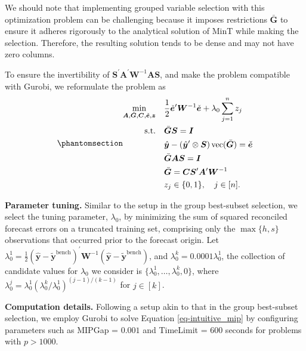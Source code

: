 \documentclass[
  11pt]{article}
\theoremstyle{plain}
\theoremstyle{remark}
\begin{document}
We should note that implementing grouped variable selection with this
optimization problem can be challenging because it imposes restrictions
\(\bar{\bm{G}}\) to ensure it adheres rigorously to the analytical
solution of MinT while making the selection. Therefore, the resulting
solution tends to be dense and may not have zero columns.

To ensure the invertibility of
\(\bm{S}^{\prime}\bm{A}^{\prime}\bm{W}^{-1}\bm{A}\bm{S}\), and make the
problem compatible with Gurobi, we reformulate the problem as
\begin{equation}\phantomsection\label{eq-intuitive_mip}{
\begin{aligned}
\min_{\bm{A},\bar{\bm{G}},\bm{C},\check{\bm{e}},\bm{z}} \quad & \frac{1}{2}\check{\bm{e}}^{\prime} \bm{W}^{-1}\check{\bm{e}} + \lambda_0 \sum_{j=1}^n z_j \\
\text{s.t.} \quad & \bar{\bm{G}}\bm{S} = \bm{I} \\
& \hat{\bm{y}}-\left(\hat{\bm{y}}^{\prime} \otimes \bm{S}\right)\operatorname{vec}(\bar{\bm{G}}) = \check{\bm{e}} \\
& \bar{\bm{G}}\bm{A}\bm{S} = \bm{I} \\
& \bar{\bm{G}} = \bm{C}\bm{S}^{\prime}\bm{A}^{\prime}\bm{W}^{-1} \\
& z_j \in\{0,1\}, \quad j \in[n].
\end{aligned}
}\end{equation}

\textbf{Parameter tuning.} Similar to the setup in the group best-subset
selection, we select the tuning parameter, \(\lambda_0\), by minimizing
the sum of squared reconciled forecast errors on a truncated training
set, comprising only the \(\max\{h, s\}\) observations that occurred
prior to the forecast origin. Let
\(\lambda_{0}^{1} = \frac{1}{2}\left(\hat{\bm{y}}-\tilde{\bm{y}}^{\text{bench}}\right)^{\prime} \bm{W}^{-1}\left(\hat{\bm{y}}-\tilde{\bm{y}}^{\text{bench}}\right)\),
and \(\lambda_{0}^{k} = 0.0001\lambda_{0}^{1}\), the collection of
candidate values for \(\lambda_0\) we consider is
\(\{\lambda_{0}^{1},\dots,\lambda_{0}^{k}, 0\}\), where
\(\lambda_{0}^{j} = \lambda_{0}^{1}\left(\lambda_{0}^{k} / \lambda_{0}^{1}\right)^{(j-1) / (k-1)}\)
for \(j \in [k]\).

\textbf{Computation details.} Following a setup akin to that in the
group best-subset selection, we employ Gurobi to solve Equation
\eqref{eq-intuitive_mip} by configuring parameters such as MIPGap =
\(0.001\) and TimeLimit = \(600\) seconds for problems with
\(p > 1000\).
\end{document}
